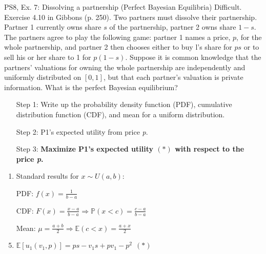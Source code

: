 \begin{frame}{PS8, Ex. 7: Dissolving a partnership (Perfect Bayesian Equilibria)}
    Difficult. Exercise 4.10 in Gibbons (p. 250). Two partners must dissolve their partnership. Partner 1 currently owns share $s$ of the partnership, partner 2 owns share $1-s$. The partners agree to play the following game: partner 1 names a price, $p$, for the whole partnership, and partner 2 then chooses either to buy l's share for $ps$ or to sell his or her share to 1 for $p(1-s)$. Suppose it is common knowledge that the partners' valuations for owning the whole partnership are independently and uniformly distributed on $[0,1]$, but that each partner's valuation is private information. What is the perfect Bayesian equilibrium?\vspace{-11pt}
    \begin{multicols}{2}
      \begin{itemize}
        \item[Step 1:] Write up the probability density function (PDF), cumulative distribution function (CDF), and mean for a uniform distribution.
        \item[Step 2:] P1's expected utility from price \textit{p}.
        \item[Step 3:] \textbf{Maximize P1's expected utility $(*)$ with respect to the price \textit{p}.}
      \end{itemize}\vspace{-8pt}
      \vfill\null\columnbreak
      \begin{enumerate}
        \item Standard results for $x\sim U(a, b):$
        \item[PDF:]  $f(x)=\frac{1}{b-a}$
        \item[CDF:]  $F(x)=\frac{x-a}{b-a}\Rightarrow\mathbb{P}(x<c)=\frac{c-a}{b-a}$
        \item[Mean:] $\mu=\frac{a+b}{2}\Rightarrow\mathbb{E}(c<x)=\frac{a+x}{2}$
        \item $\mathbb{E}[u_1(v_1,p)]=ps-v_1s+pv_1-p^2\ \ (*)$
      \end{enumerate}
      \vfill\null
    \end{multicols}
\end{frame}
